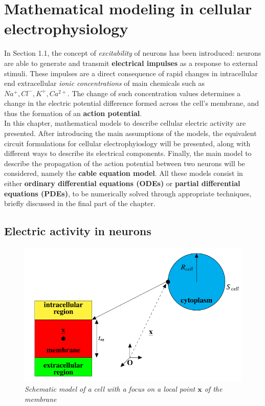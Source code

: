 \documentclass[a4paper]{article}
\begin{document}
	

	
\section{Mathematical modeling in cellular electrophysiology}

In Section 1.1, the concept of \textit{excitability} of neurons has been introduced: neurons are able to generate and transmit \textbf{electrical impulses} as a response to external stimuli. These impulses are a direct consequence of rapid changes in intracellular end extracellular \textit{ionic concentrations} of main chemicals such as $Na^+, Cl^-, K^+, Ca^{2+}$. The change of such concentration values determines a change in the electric potential difference formed across the cell's membrane, and thus the formation of an \textbf{action potential}. \\
In this chapter, mathematical models to describe cellular electric activity are presented. After introducing the main assumptions of the models, the equivalent circuit formulations for cellular electrophyioslogy will be presented, along with different ways to describe its electrical components. Finally, the main model to describe the propagation of the action potential between two neurons will be considered, namely the \textbf{cable equation model}. All these models consist in either \textbf{ordinary differential equations (ODEs)} or \textbf{partial differential equations (PDEs)}, to be numerically solved through appropriate techniques, briefly discussed in the final part of the chapter.

\subsection{Electric activity in neurons}


\begin{figure}[H]
	\begin{center}
		\includegraphics[scale=0.77]{first.png} 
	\end{center} 
	\caption{\textit{Schematic model of a cell with a focus on a local point $\textbf{x}$ of the membrane}}
	
\end{figure}
\end{document}
